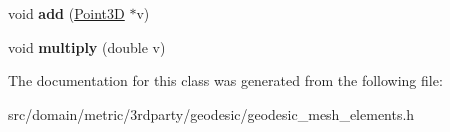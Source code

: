 \begin{DoxyCompactItemize}
\item 
\hypertarget{classgeodesic_1_1_point3_d_a97f5b5c5e1d9c54dfe9e838ba1988dc3}{}void {\bfseries add} (\hyperlink{classgeodesic_1_1_point3_d}{Point3\+D} $\ast$v)\label{classgeodesic_1_1_point3_d_a97f5b5c5e1d9c54dfe9e838ba1988dc3}

\item 
\hypertarget{classgeodesic_1_1_point3_d_ac50ecd9e0432f4b4daee76694d850626}{}void {\bfseries multiply} (double v)\label{classgeodesic_1_1_point3_d_ac50ecd9e0432f4b4daee76694d850626}

\end{DoxyCompactItemize}


The documentation for this class was generated from the following file\+:\begin{DoxyCompactItemize}
\item 
src/domain/metric/3rdparty/geodesic/geodesic\+\_\+mesh\+\_\+elements.\+h\end{DoxyCompactItemize}
